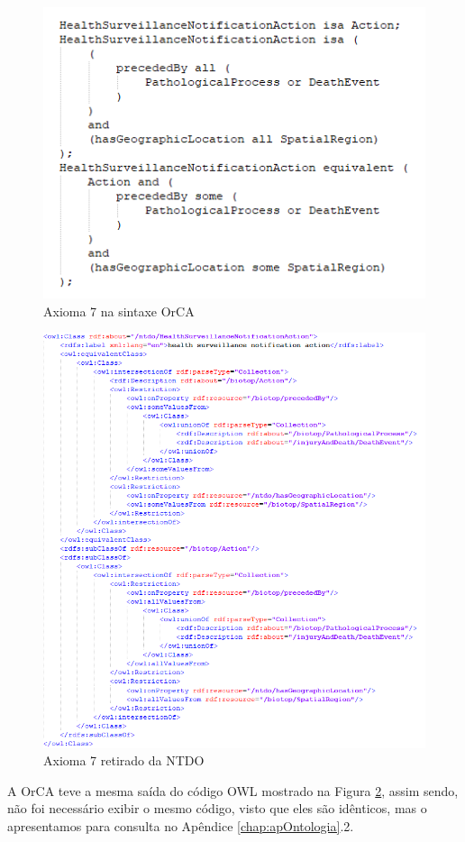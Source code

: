 \documentclass{bcc}
\begin{document}
\begin{figure}[H]
\centering
\includegraphics[width=.7\textwidth]{Figuras/axioma7_orca.png}
\caption{Axioma 7 na sintaxe OrCA} 
\label{fig:axioma7_orca}
\end{figure}

\begin{figure}[H]
\centering
\includegraphics[width=1\textwidth]{Figuras/axioma7_o.png}
\caption{Axioma 7 retirado da NTDO} 
\label{fig:axioma7_o}
\end{figure}

A OrCA teve a mesma saída do código OWL mostrado na Figura \ref{fig:axioma7_o}, assim sendo, não foi  necessário exibir o mesmo código, visto que eles são idênticos, mas o apresentamos para consulta no Apêndice \ref{chap:apOntologia}.2.
\end{document}
